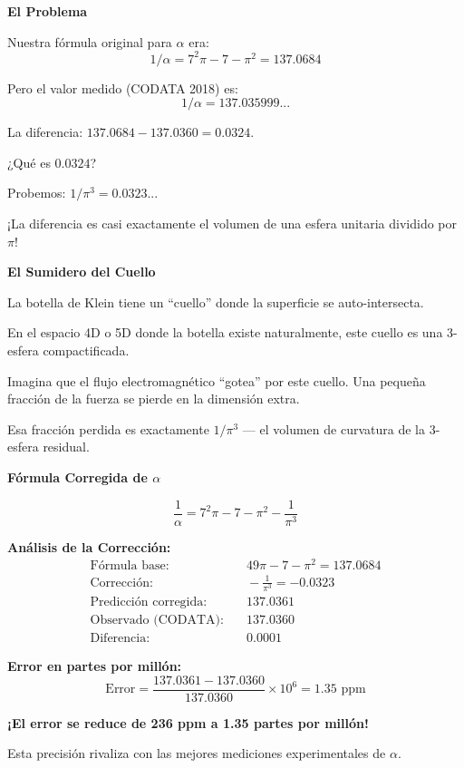 \begin{nivelconceptual}
\textbf{El Problema}

Nuestra fórmula original para $\alpha$ era:
\[1/\alpha = 7^2\pi - 7 - \pi^2 = 137.0684\]

Pero el valor medido (CODATA 2018) es:
\[1/\alpha = 137.035999...\]

La diferencia: $137.0684 - 137.0360 = 0.0324$.

¿Qué es $0.0324$?

Probemos: $1/\pi^3 = 0.0323...$

¡La diferencia es casi exactamente el volumen de una esfera unitaria dividido por $\pi$!
\end{nivelconceptual}

\begin{analogiabox}
\textbf{El Sumidero del Cuello}

La botella de Klein tiene un ``cuello'' donde la superficie se auto-intersecta.

En el espacio 4D o 5D donde la botella existe naturalmente,
este cuello es una 3-esfera compactificada.

Imagina que el flujo electromagnético ``gotea'' por este cuello.
Una pequeña fracción de la fuerza se pierde en la dimensión extra.

Esa fracción perdida es exactamente $1/\pi^3$ --- el volumen de curvatura
de la 3-esfera residual.
\end{analogiabox}

\begin{nivelmatematico}
\textbf{Fórmula Corregida de $\alpha$}

\begin{equation}
\boxed{\frac{1}{\alpha} = 7^2\pi - 7 - \pi^2 - \frac{1}{\pi^3}}
\end{equation}

\textbf{Análisis de la Corrección:}
\begin{align}
\text{Fórmula base:} & \quad 49\pi - 7 - \pi^2 = 137.0684\\
\text{Corrección:} & \quad -\frac{1}{\pi^3} = -0.0323\\
\text{Predicción corregida:} & \quad 137.0361\\
\text{Observado (CODATA):} & \quad 137.0360\\
\text{Diferencia:} & \quad 0.0001
\end{align}

\textbf{Error en partes por millón:}
\[\text{Error} = \frac{137.0361 - 137.0360}{137.0360} \times 10^6 = 1.35 \text{ ppm}\]

\textbf{¡El error se reduce de 236 ppm a 1.35 partes por millón!}

Esta precisión rivaliza con las mejores mediciones experimentales de $\alpha$.
\end{nivelmatematico}


